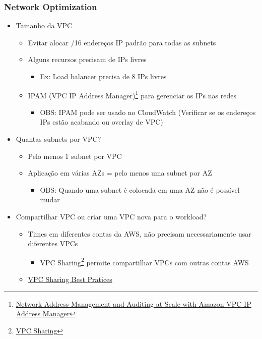 \begin{frame}[allowframebreaks]
	\frametitle{Network Optimization}
	\begin{itemize}
		\item Tamanho da VPC
			\begin{itemize}
				\item Evitar alocar /16 endereços IP padrão para todas as subnets
				\item Alguns recursos precisam de IPs livres 
					\begin{itemize}
						\item Ex: Load balancer precisa de 8 IPs livres
					\end{itemize}
				\item IPAM (VPC IP Address Manager)\footnote{\href{https://aws.amazon.com/blogs/aws/network-address-management-and-auditing-at-scale-with-amazon-vpc-ip-address-manager/}{Network Address Management and Auditing at Scale with Amazon VPC IP Address Manager}} para gerenciar os IPs nas redes
					\begin{itemize}
						\item OBS: IPAM pode ser usado no CloudWatch (Verificar se os endereços IPs estão acabando ou overlay de VPC)
					\end{itemize}
			\end{itemize}
		\framebreak
		\item Quantas subnets por VPC?
			\begin{itemize}
				\item Pelo menos 1 subnet por VPC
				\item Aplicação em várias AZs = pelo menos uma subnet por AZ
					\begin{itemize}
						\item OBS: Quando uma subnet é colocada em uma AZ não é possível mudar
					\end{itemize}
			\end{itemize}
		\item Compartilhar VPC ou criar uma VPC nova para o workload?
			\begin{itemize}
				\item Times em diferentes contas da AWS, não precisam necessariamente usar diferentes VPCs
					\begin{itemize}
						\item VPC Sharing\footnote{\href{https://aws.amazon.com/blogs/networking-and-content-delivery/vpc-sharing-a-new-approach-to-multiple-accounts-and-vpc-management/}{VPC Sharing}} permite compartilhar VPCs com outras contas AWS
					\end{itemize}
				\item \href{https://aws.amazon.com/blogs/networking-and-content-delivery/vpc-sharing-key-considerations-and-best-practices/}{VPC Sharing Best Pratices}
			\end{itemize}
	\end{itemize}
\end{frame}
